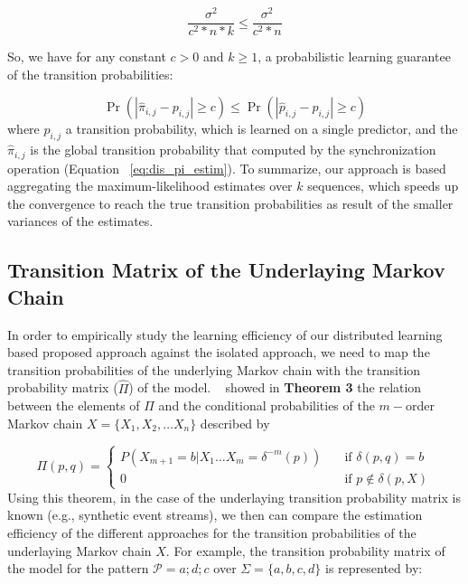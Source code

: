 \[ 
\frac{\sigma^{2}}{c^2 *n*k} \leq
\frac{\sigma^{2}}{c^2 * n}
 \]

So, we have for any constant $c > 0$ and $k \ge 1$, a probabilistic learning guarantee of the transition probabilities: 

\[ \Pr\left( |\hat{\pi}_{i,j} - {p}_{i,j}| \geq c \right) \leq
 \Pr\left( |\hat{p}_{i,j} - {p}_{i,j}| \geq c \right)
 \]
 where $\hat{p}_{i,j}$ a transition probability, which is learned on a single \pmcmr predictor, and the $\hat{\pi}_{i,j}$ is the global transition probability that computed by the synchronization operation (Equation ~\ref{eq:dis_pi_estim}). To summarize, our approach is based aggregating the maximum-likelihood estimates over $k$ sequences, which speeds up the convergence to reach the true transition probabilities as result of the smaller variances of the estimates.


 
\subsection{Transition Matrix of the Underlaying Markov Chain}
\label{sec:underlaying_mc}
\par In order to empirically study the learning efficiency of our distributed learning based proposed approach against the isolated approach, we need to map the transition probabilities of the underlying Markov chain with the transition probability matrix ($\hat{\Pi}$) of the \pmcmr model. ~\citet{nuel_pattern_2008} showed in \textbf{Theorem 3} the relation between the elements  of 
$\Pi$ and the conditional probabilities of the $m-$order Markov chain $X=\{X_1, X_2, \ldots X_n\}$ described by 

\[ \Pi(p, q) =
\begin{cases}
P(X_{m+1}=b|X_1\ldots X_m=\delta^{-m}(p))     & \quad \text{if } \delta(p,q)=b \\
0  & \quad \text{if } p \notin  \delta(p,X)
\end{cases}
\]
Using this theorem, in the case of the underlaying transition probability matrix is known (e.g., synthetic event streams),  we then can compare the estimation efficiency of the different approaches for the transition probabilities of the underlaying Markov chain $X$.  For example, the transition probability matrix of the \pmcmr model for the pattern $\mathcal{P}=a ; d ; c$ over  $\Sigma=\{a,b,c,d\}$ is represented by: 

